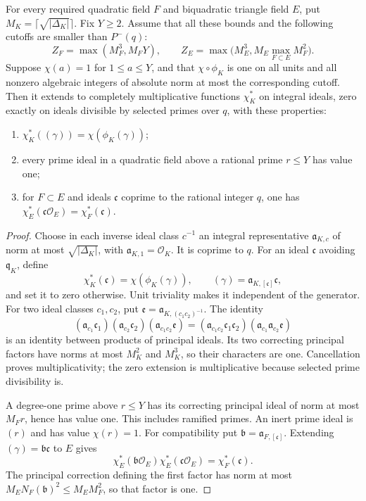 \begin{lemma}
\label{lem:qp-assembly}
For every required quadratic field $F$ and biquadratic triangle field
$E$, put $M_K=\lceil\sqrt{|\Delta_K|}\rceil$.  Fix $Y\geq2$.  Assume
that all these bounds and the following cutoffs are smaller than $P^-(q)$:
\[
 Z_F=\max(M_F^3,M_FY),\qquad
 Z_E=\max\bigl(M_E^3,M_E\max_{F\subset E}M_F^2\bigr).
\]
Suppose $\chi(a)=1$ for $1\leq a\leq Y$, and that $\chi\circ\phi_K$
is one on all units and all nonzero algebraic integers of absolute norm
at most the corresponding cutoff.  Then it extends to completely
multiplicative functions $\chi_K^*$ on integral ideals, zero exactly on
ideals divisible by selected primes over $q$, with these properties:
\begin{enumerate}
\item $\chi_K^*((\gamma))=\chi(\phi_K(\gamma))$;
\item every prime ideal in a quadratic field above a rational prime
      $r\leq Y$ has value one;
\item for $F\subset E$ and ideals $\mathfrak c$ coprime to the rational
      integer $q$, one has
      $\chi_E^*(\mathfrak c\mathcal O_E)=\chi_F^*(\mathfrak c)$.
\end{enumerate}
\end{lemma}

\begin{proof}
Choose in each inverse ideal class $c^{-1}$ an integral representative
$\mathfrak a_{K,c}$ of norm at most $\sqrt{|\Delta_K|}$, with
$\mathfrak a_{K,1}=\mathcal O_K$.  It is coprime to $q$.
For an ideal $\mathfrak c$ avoiding $\mathfrak q_K$, define
\[
 \chi_K^*(\mathfrak c)=\chi(\phi_K(\gamma)),
 \qquad (\gamma)=\mathfrak a_{K,[\mathfrak c]}\mathfrak c,
\]
and set it to zero otherwise.  Unit triviality makes it independent of
the generator.  For two ideal classes $c_1,c_2$, put
$\mathfrak e=\mathfrak a_{K,(c_1c_2)^{-1}}$.  The identity
\[
 (\mathfrak a_{c_1}\mathfrak c_1)
 (\mathfrak a_{c_2}\mathfrak c_2)(\mathfrak a_{c_1c_2}\mathfrak e)
 =
 (\mathfrak a_{c_1c_2}\mathfrak c_1\mathfrak c_2)
 (\mathfrak a_{c_1}\mathfrak a_{c_2}\mathfrak e)
\]
is an identity between products of principal ideals.  Its two correcting
principal factors have norms at most $M_K^2$ and $M_K^3$, so their
characters are one.  Cancellation proves multiplicativity; the zero
extension is multiplicative because selected prime divisibility is.

A degree-one prime above $r\leq Y$ has its correcting principal ideal
of norm at most $M_Fr$, hence has value one.  This includes ramified
primes.  An inert prime ideal is $(r)$ and has value $\chi(r)=1$.
For compatibility put $\mathfrak b=\mathfrak a_{F,[\mathfrak c]}$.
Extending $(\gamma)=\mathfrak b\mathfrak c$ to $E$ gives
\[
 \chi_E^*(\mathfrak b\mathcal O_E)
 \chi_E^*(\mathfrak c\mathcal O_E)=\chi_F^*(\mathfrak c).
\]
The principal correction defining the first factor has norm at most
$M_E N_F(\mathfrak b)^2\leq M_E M_F^2$, so that factor is one.
\end{proof}

